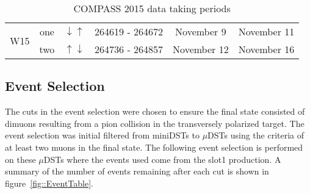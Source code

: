 \begin{table}[h!]
\begin{tabular}{ |c|c|c|c|c|c| }
      \multirow{2}{2em}{W15}&  one&  $\downarrow \uparrow$&  264619 - 264672&  November 9&  November 11 \\
      & two&  $\uparrow \downarrow$&  264736 - 264857&  November 12&  November 16 \\
      \hline
      
    \end{tabular}
    \caption{COMPASS 2015 data taking periods}
    \label{tab::datataking}
  \end{table}


\subsection{Event Selection}
The cuts in the event selection were chosen to ensure the final state consisted
of dimuons resulting from a pion collision in the transversely polarized target.
The event selection was initial filtered from miniDSTs to $\mu$DSTs using the
criteria of at least two muons in the final state.  The following event
selection is performed on these $\mu$DSTs where the events used come from the
slot1 production.  A summary of the number of events remaining after each cut is
shown in figure~\ref{fig::EventTable}.
